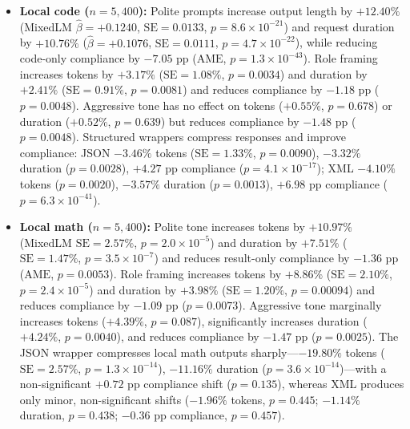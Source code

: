 \documentclass[a4paper,fleqn]{cas-sc}
\providecommand{\tightlist}{%
  \setlength{\itemsep}{0pt}\setlength{\parskip}{0pt}}
\begin{document}
\begin{itemize}
\tightlist
\item \textbf{Local code ($n = 5,400$):} Polite prompts increase output length by $+12.40\%$ (MixedLM $\hat{\beta} = +0.1240$, $\text{SE} = 0.0133$, $p = 8.6 \times 10^{-21}$) and request duration by $+10.76\%$ ($\hat{\beta} = +0.1076$, $\text{SE} = 0.0111$, $p = 4.7 \times 10^{-22}$), while reducing code-only compliance by $-7.05$ pp ($\text{AME}$, $p = 1.3 \times 10^{-43}$). Role framing increases tokens by $+3.17\%$ ($\text{SE} = 1.08\%$, $p = 0.0034$) and duration by $+2.41\%$ ($\text{SE} = 0.91\%$, $p = 0.0081$) and reduces compliance by $-1.18$ pp ($p = 0.0048$). Aggressive tone has no effect on tokens ($+0.55\%$, $p = 0.678$) or duration ($+0.52\%$, $p = 0.639$) but reduces compliance by $-1.48$ pp ($p = 0.0048$). Structured wrappers compress responses and improve compliance: JSON $-3.46\%$ tokens ($\text{SE} = 1.33\%$, $p = 0.0090$), $-3.32\%$ duration ($p = 0.0028$), $+4.27$ pp compliance ($p = 4.1 \times 10^{-17}$); XML $-4.10\%$ tokens ($p = 0.0020$), $-3.57\%$ duration ($p = 0.0013$), $+6.98$ pp compliance ($p = 6.3 \times 10^{-41}$).
\item \textbf{Local math ($n = 5,400$):} Polite tone increases tokens by $+10.97\%$ (MixedLM $\text{SE} = 2.57\%$, $p = 2.0 \times 10^{-5}$) and duration by $+7.51\%$ ($\text{SE} = 1.47\%$, $p = 3.5 \times 10^{-7}$) and reduces result-only compliance by $-1.36$ pp ($\text{AME}$, $p = 0.0053$). Role framing increases tokens by $+8.86\%$ ($\text{SE} = 2.10\%$, $p = 2.4 \times 10^{-5}$) and duration by $+3.98\%$ ($\text{SE} = 1.20\%$, $p = 0.00094$) and reduces compliance by $-1.09$ pp ($p = 0.0073$). Aggressive tone marginally increases tokens ($+4.39\%$, $p = 0.087$), significantly increases duration ($+4.24\%$, $p = 0.0040$), and reduces compliance by $-1.47$ pp ($p = 0.0025$). The JSON wrapper compresses local math outputs sharply—$-19.80\%$ tokens ($\text{SE} = 2.57\%$, $p = 1.3 \times 10^{-14}$), $-11.16\%$ duration ($p = 3.6 \times 10^{-14}$)—with a non-significant $+0.72$ pp compliance shift ($p = 0.135$), whereas XML produces only minor, non-significant shifts ($-1.96\%$ tokens, $p = 0.445$; $-1.14\%$ duration, $p = 0.438$; $-0.36$ pp compliance, $p = 0.457$).

\end{itemize}
\end{document}
